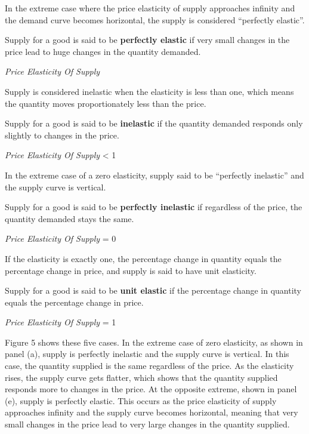 In the extreme case where the price elasticity of supply approaches infinity and the demand curve becomes horizontal,
the supply is considered ``perfectly elastic''.

Supply for a good is said to be \textbf{perfectly elastic} if very small changes in the price lead to huge changes in
the quantity demanded.

\bse
\textit{Price Elasticity Of Supply} \to \infty
\ese
\ed

Supply is considered inelastic when the elasticity is less than one, which means the quantity moves proportionately
less than the price.

Supply for a good is said to be \textbf{inelastic} if the quantity demanded responds only slightly to changes in the
price.

\bse
\textit{Price Elasticity Of Supply} < 1
\ese
\ed

In the extreme case of a zero elasticity, supply said to be ``perfectly inelastic'' and the supply curve is vertical.

Supply for a good is said to be \textbf{perfectly inelastic} if regardless of the price, the quantity demanded stays the
same.

\bse
\textit{Price Elasticity Of Supply} = 0
\ese
\ed

If the elasticity is exactly one, the percentage change in quantity equals the percentage change in price, and supply
is said to have unit elasticity.

Supply for a good is said to be \textbf{unit elastic} if the percentage change in quantity equals the percentage change
in price.

\bse
\textit{Price Elasticity Of Supply} = 1
\ese
\ed

Figure 5 shows these five cases. In the extreme case of zero elasticity, as shown in panel (a), supply is perfectly
inelastic and the supply curve is vertical. In this case, the quantity supplied is the same regardless of the price.
As the elasticity rises, the supply curve gets flatter, which shows that the quantity supplied responds more to
changes in the price. At the opposite extreme, shown in panel (e), supply is perfectly elastic. This occurs as the
price elasticity of supply approaches infinity and the supply curve becomes horizontal, meaning that very small
changes in the price lead to very large changes in the quantity supplied.

